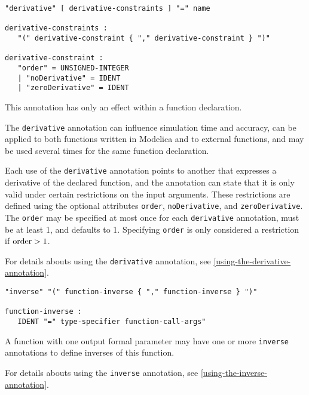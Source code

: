 \begin{annotationdefinition}[derivative]
\begin{synopsis}[grammar]\begin{lstlisting}
"derivative" [ derivative-constraints ] "=" name

derivative-constraints :
   "(" derivative-constraint { "," derivative-constraint } ")"

derivative-constraint :
   "order" = UNSIGNED-INTEGER
   | "noDerivative" = IDENT
   | "zeroDerivative" = IDENT
\end{lstlisting}\end{synopsis}
\begin{semantics}
This annotation has only an effect within a function declaration.

The {\lstinline!derivative!} annotation can influence simulation time and accuracy, can be applied to both functions written in Modelica and to external functions, and may be used several times for the same function declaration.

Each use of the {\lstinline!derivative!} annotation points to another  that expresses a derivative of the declared function, and the annotation can state that it is only valid under certain restrictions on the input arguments.
These restrictions are defined using the optional attributes {\lstinline!order!}, {\lstinline!noDerivative!}, and {\lstinline!zeroDerivative!}.
The {\lstinline!order!} may be specified at most once for each {\lstinline!derivative!} annotation, must be at least 1, and defaults to 1.
Specifying {\lstinline!order!} is only considered a restriction if $\text{{\lstinline!order!}} > 1$.

For details abouts using the {\lstinline!derivative!} annotation, see \cref{using-the-derivative-annotation}.
\end{semantics}
\end{annotationdefinition}

\begin{annotationdefinition}[inverse]
\begin{synopsis}[grammar]\begin{lstlisting}
"inverse" "(" function-inverse { "," function-inverse } ")"

function-inverse :
   IDENT "=" type-specifier function-call-args"
\end{lstlisting}\end{synopsis}
\begin{semantics}
A function with one output formal parameter may have one or more {\lstinline!inverse!} annotations to define inverses of this function.

For details abouts using the {\lstinline!inverse!} annotation, see \cref{using-the-inverse-annotation}.
\end{semantics}
\end{annotationdefinition}


